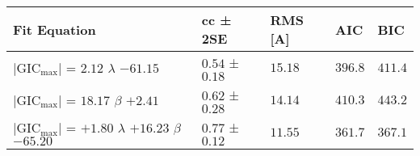 \begin{tabular}{lllll}
\toprule
Fit Equation & cc ± 2SE & RMS [A] & AIC & BIC \\
\midrule
$\vert{\text{GIC}_\text{max}}\vert$ = $2.12$ $\lambda$ $-61.15$ & $0.54$ ± $0.18$ & $15.18$ & $396.8$ & $411.4$ \\
$\vert{\text{GIC}_\text{max}}\vert$ = $18.17$ $\beta$ $+2.41$ & $0.62$ ± $0.28$ & $14.14$ & $410.3$ & $443.2$ \\
$\vert{\text{GIC}_\text{max}}\vert$ = $+1.80$ $\lambda$ $+16.23$ $\beta$ $-65.20$ & $0.77$ ± $0.12$ & $11.55$ & $361.7$ & $367.1$ \\
\bottomrule
\end{tabular}
